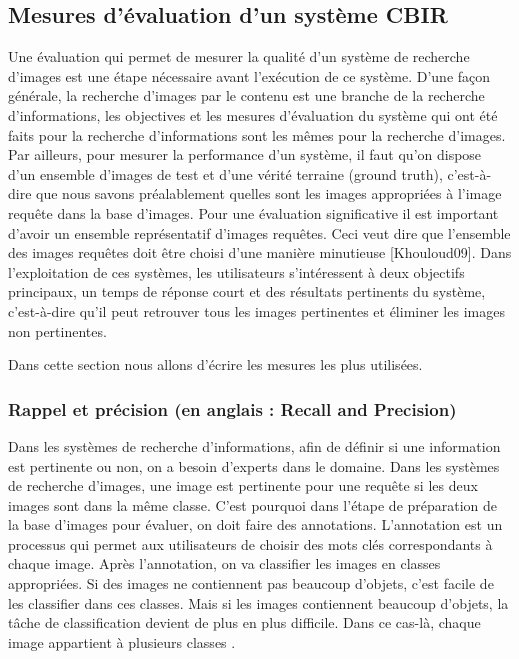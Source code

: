 \subsection{Mesures d’évaluation d’un système CBIR}
Une évaluation qui permet de mesurer la qualité d’un système de
recherche d’images est une étape nécessaire avant l’exécution de ce système. D’une façon générale, la recherche d’images par le contenu est une branche de la recherche d’informations, les objectives et les mesures d’évaluation du système qui ont été faits pour la recherche d’informations sont les mêmes
pour la recherche d’images. Par ailleurs, pour mesurer la performance d’un système, il faut qu'on dispose d'un ensemble d’images de test et d'une vérité terraine  (ground truth),
c'est-à-dire que nous savons préalablement quelles sont les images
appropriées à l'image requête dans la base d'images. Pour une évaluation significative il est important d'avoir un ensemble représentatif d'images requêtes. Ceci veut dire que l'ensemble des images requêtes doit être choisi d’une manière minutieuse [Khouloud09].
Dans l’exploitation de ces systèmes, les utilisateurs s’intéressent à deux objectifs principaux, un temps de réponse court et des résultats pertinents  du système, c'est-à-dire qu’il peut retrouver tous les images pertinentes et éliminer les images non pertinentes.


Dans cette section nous allons d’écrire les mesures les plus utilisées.

\subsubsection{Rappel et précision (en anglais : Recall and Precision)}

Dans les systèmes de recherche d’informations, afin de définir si une
information est pertinente ou non, on a besoin d’experts dans le domaine.
Dans les systèmes de recherche d’images, une image est pertinente pour une
requête si les deux images sont dans la même classe. C’est pourquoi dans
l’étape de préparation de la base d’images pour évaluer, on doit faire des
annotations. L’annotation est un processus qui permet aux utilisateurs de
choisir des mots clés correspondants à chaque image. Après l’annotation, on va classifier les images en classes appropriées. Si des images ne contiennent pas beaucoup d’objets, c’est facile de les classifier dans ces classes. Mais si les images contiennent beaucoup d’objets, la tâche de classification devient de plus en plus difficile. Dans ce cas-là, chaque image appartient à plusieurs classes .

